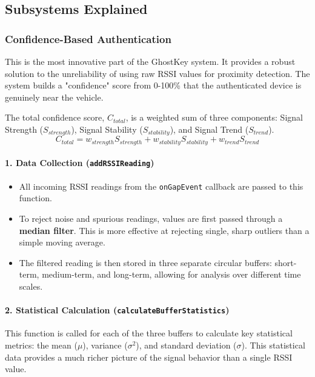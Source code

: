 \documentclass{article}
\begin{document}
\subsection{Subsystems Explained}
\subsubsection{Confidence-Based Authentication}
This is the most innovative part of the GhostKey system. It provides a robust solution to the unreliability of using raw RSSI values for proximity detection. The system builds a "confidence" score from 0-100\% that the authenticated device is genuinely near the vehicle.

The total confidence score, $C_{total}$, is a weighted sum of three components: Signal Strength ($S_{strength}$), Signal Stability ($S_{stability}$), and Signal Trend ($S_{trend}$).
$$C_{total} = w_{strength}S_{strength} + w_{stability}S_{stability} + w_{trend}S_{trend}$$

\paragraph{1. Data Collection (\texttt{addRSSIReading})}
\begin{itemize}
    \item All incoming RSSI readings from the \texttt{onGapEvent} callback are passed to this function.
    \item To reject noise and spurious readings, values are first passed through a \textbf{median filter}. This is more effective at rejecting single, sharp outliers than a simple moving average.
    \item The filtered reading is then stored in three separate circular buffers: short-term, medium-term, and long-term, allowing for analysis over different time scales.
\end{itemize}

\paragraph{2. Statistical Calculation (\texttt{calculateBufferStatistics})}
This function is called for each of the three buffers to calculate key statistical metrics: the mean ($\mu$), variance ($\sigma^2$), and standard deviation ($\sigma$). This statistical data provides a much richer picture of the signal behavior than a single RSSI value.
\end{document}

